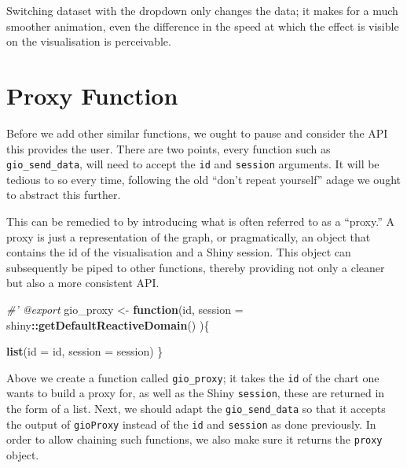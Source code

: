 \documentclass[10pt,]{krantz}
\makeatletter
\newenvironment{Shaded}{\begin{snugshade}}{\end{snugshade}}
\newcommand{\CommentTok}[1]{\textcolor[rgb]{0.37,0.37,0.37}{\textit{#1}}}
\newcommand{\ControlFlowTok}[1]{\textcolor[rgb]{0.27,0.27,0.27}{\textbf{#1}}}
\newcommand{\DataTypeTok}[1]{\textcolor[rgb]{0.27,0.27,0.27}{#1}}
\newcommand{\DecValTok}[1]{\textcolor[rgb]{0.06,0.06,0.06}{#1}}
\newcommand{\KeywordTok}[1]{\textcolor[rgb]{0.27,0.27,0.27}{\textbf{#1}}}
\newcommand{\NormalTok}[1]{#1}
\newcommand{\OperatorTok}[1]{\textcolor[rgb]{0.43,0.43,0.43}{\textbf{#1}}}
\newcommand{\StringTok}[1]{\textcolor[rgb]{0.5,0.5,0.5}{#1}}
\newenvironment{kframe}{%
\medskip{}
\setlength{\fboxsep}{.8em}
 \def\at@end@of@kframe{}%
 \ifinner\ifhmode%
  \def\at@end@of@kframe{\end{minipage}}%
  \begin{minipage}{\columnwidth}%
 \fi\fi%
 \def\FrameCommand##1{\hskip\@totalleftmargin \hskip-\fboxsep
 \colorbox{shadecolor}{##1}\hskip-\fboxsep
     \hskip-\linewidth \hskip-\@totalleftmargin \hskip\columnwidth}%
 \MakeFramed {\advance\hsize-\width
   \@totalleftmargin\z@ \linewidth\hsize
   \@setminipage}}%
 {\par\unskip\endMakeFramed%
 \at@end@of@kframe}
\renewenvironment{Shaded}{\begin{kframe}}{\end{kframe}}
\makeatother
\begin{document}
Switching dataset with the dropdown only changes the data; it makes for a much smoother animation, even the difference in the speed at which the effect is visible on the visualisation is perceivable.

\hypertarget{shiny-widgets-proxy}{%
\section{Proxy Function}\label{shiny-widgets-proxy}}

Before we add other similar functions, we ought to pause and consider the API this provides the user. There are two points, every function such as \texttt{gio\_send\_data}, will need to accept the \texttt{id} and \texttt{session} arguments. It will be tedious to so every time, following the old ``don't repeat yourself'' adage we ought to abstract this further.

This can be remedied to by introducing what is often referred to as a ``proxy.'' A proxy is just a representation of the graph, or pragmatically, an object that contains the id of the visualisation and a Shiny session. This object can subsequently be piped to other functions, thereby providing not only a cleaner but also a more consistent API.

\begin{Shaded}
\begin{Highlighting}[]
\CommentTok{#' @export}
\NormalTok{gio_proxy <-}\StringTok{ }\ControlFlowTok{function}\NormalTok{(id, }
  \DataTypeTok{session =}\NormalTok{ shiny}\OperatorTok{::}\KeywordTok{getDefaultReactiveDomain}\NormalTok{()}
\NormalTok{)\{}

  \KeywordTok{list}\NormalTok{(}\DataTypeTok{id =}\NormalTok{ id, }\DataTypeTok{session =}\NormalTok{ session)}
\NormalTok{\}}
\end{Highlighting}
\end{Shaded}

Above we create a function called \texttt{gio\_proxy}; it takes the \texttt{id} of the chart one wants to build a proxy for, as well as the Shiny \texttt{session}, these are returned in the form of a list. Next, we should adapt the \texttt{gio\_send\_data} so that it accepts the output of \texttt{gioProxy} instead of the \texttt{id} and \texttt{session} as done previously. In order to allow chaining such functions, we also make sure it returns the \texttt{proxy} object.

\begin{Shaded}
\end{Shaded}
\end{document}

